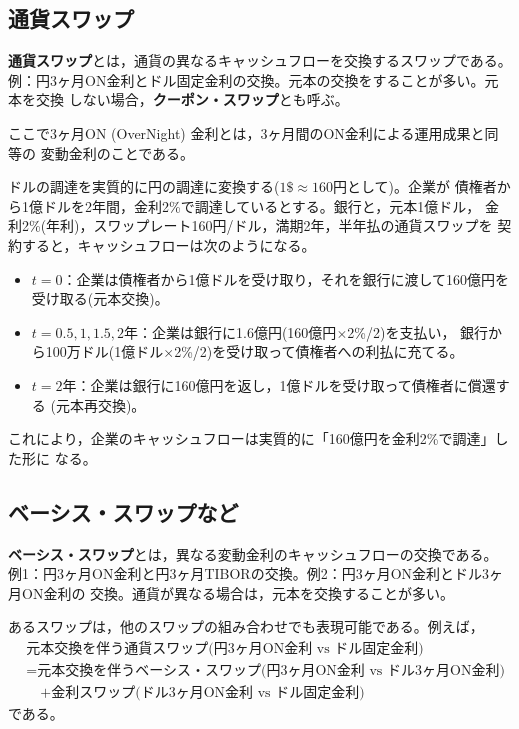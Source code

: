 \vspace{18pt}

\subsection{通貨スワップ}

\begin{definition}[通貨スワップ]
\textbf{通貨スワップ}とは，通貨の異なるキャッシュフローを交換するスワップである。
例：円3ヶ月ON金利とドル固定金利の交換。元本の交換をすることが多い。元本を交換
しない場合，\textbf{クーポン・スワップ}とも呼ぶ。
\end{definition}

ここで3ヶ月ON (OverNight) 金利とは，3ヶ月間のON金利による運用成果と同等の
変動金利のことである。

\begin{example}[通貨スワップの例]
ドルの調達を実質的に円の調達に変換する($1\$ \approx 160$円として)。企業が
債権者から1億ドルを2年間，金利2\%で調達しているとする。銀行と，元本1億ドル，
金利2\%(年利)，スワップレート160円/ドル，満期2年，半年払の通貨スワップを
契約すると，キャッシュフローは次のようになる。
\begin{itemize}
\item $t=0$：企業は債権者から1億ドルを受け取り，それを銀行に渡して160億円を
受け取る(元本交換)。
\item $t=0.5,1,1.5,2$年：企業は銀行に1.6億円(160億円$\times$2\%/2)を支払い，
銀行から100万ドル(1億ドル$\times$2\%/2)を受け取って債権者への利払に充てる。
\item $t=2$年：企業は銀行に160億円を返し，1億ドルを受け取って債権者に償還する
(元本再交換)。
\end{itemize}
これにより，企業のキャッシュフローは実質的に「160億円を金利2\%で調達」した形に
なる。
\end{example}

\vspace{18pt}

\subsection{ベーシス・スワップなど}

\textbf{ベーシス・スワップ}とは，異なる変動金利のキャッシュフローの交換である。
例1：円3ヶ月ON金利と円3ヶ月TIBORの交換。例2：円3ヶ月ON金利とドル3ヶ月ON金利の
交換。通貨が異なる場合は，元本を交換することが多い。

あるスワップは，他のスワップの組み合わせでも表現可能である。例えば，
\begin{align*}
&\text{元本交換を伴う通貨スワップ(円3ヶ月ON金利 vs ドル固定金利)}\\
&= \text{元本交換を伴うベーシス・スワップ(円3ヶ月ON金利 vs ドル3ヶ月ON金利)}\\
&\quad + \text{金利スワップ(ドル3ヶ月ON金利 vs ドル固定金利)}
\end{align*}
である。

